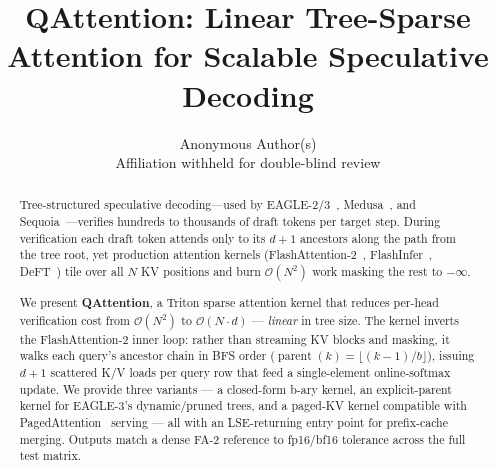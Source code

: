 \documentclass{article}
\title{%
  \textbf{QAttention: Linear Tree-Sparse Attention for Scalable Speculative Decoding}%
}
\author{%
  Anonymous Author(s) \\
  Affiliation withheld for double-blind review
}
\date{}
\newcommand{\method}{QAttention}
\newcommand{\bigO}[1]{\mathcal{O}(#1)}
\newcommand{\numtokens}{N}
\newcommand{\depth}{d}
\newcommand{\branching}{b}
\DeclareMathOperator{\parent}{parent}
\begin{document}
\maketitle

\begin{abstract}
Tree-structured speculative decoding---used by
EAGLE-2/3~\cite{li2024eagle2,li2025eagle3},
Medusa~\cite{cai2024medusa}, and Sequoia~\cite{chen2024sequoia}---verifies
hundreds to thousands of draft tokens per target step.
During verification each draft token attends only to its
$\depth{+}1$ ancestors along the path from the tree root, yet production
attention kernels (FlashAttention-2~\cite{dao2023flashattention2},
FlashInfer~\cite{ye2025flashinfer}, DeFT~\cite{yao2024deft})
tile over all $\numtokens$ KV positions and burn $\bigO{\numtokens^2}$
work masking the rest to $-\infty$.

We present \textbf{\method{}}, a Triton sparse attention kernel that reduces
per-head verification cost from $\bigO{\numtokens^2}$ to
$\bigO{\numtokens \cdot \depth}$ — \emph{linear} in tree size.
The kernel inverts the FlashAttention-2 inner loop: rather than streaming
KV blocks and masking, it walks each query's ancestor chain in BFS order
($\parent(k){=}\lfloor(k{-}1)/\branching\rfloor$), issuing $\depth{+}1$
scattered K/V loads per query row that feed a single-element online-softmax
update. We provide three variants — a closed-form b-ary kernel, an
explicit-parent kernel for EAGLE-3's dynamic/pruned trees, and a paged-KV
kernel compatible with PagedAttention~\cite{kwon2023efficient} serving — all
with an LSE-returning entry point for prefix-cache merging. Outputs match a
dense FA-2 reference to fp16/bf16 tolerance across the full test matrix.


\end{abstract}
\end{document}
